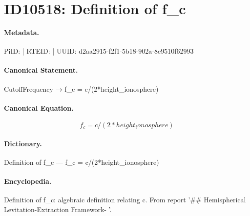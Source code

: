 \section*{ID10518: Definition of f\_c}
\paragraph{Metadata.}
PiID:  | RTEID:  | UUID: d2aa2915-f2f1-5b18-902a-8e9510f62993

\paragraph{Canonical Statement.}
CutoffFrequency → f\_c = c/(2*height\_ionosphere)

\paragraph{Canonical Equation.}
\[
f_c = c/(2*height_ionosphere)
\]

\paragraph{Dictionary.}
Definition of f\_c — f\_c = c/(2*height\_ionosphere)

\paragraph{Encyclopedia.}
Definition of f\_c: algebraic definition relating c. From report '\#\# Hemispherical Levitation-Extraction Framework- '.
